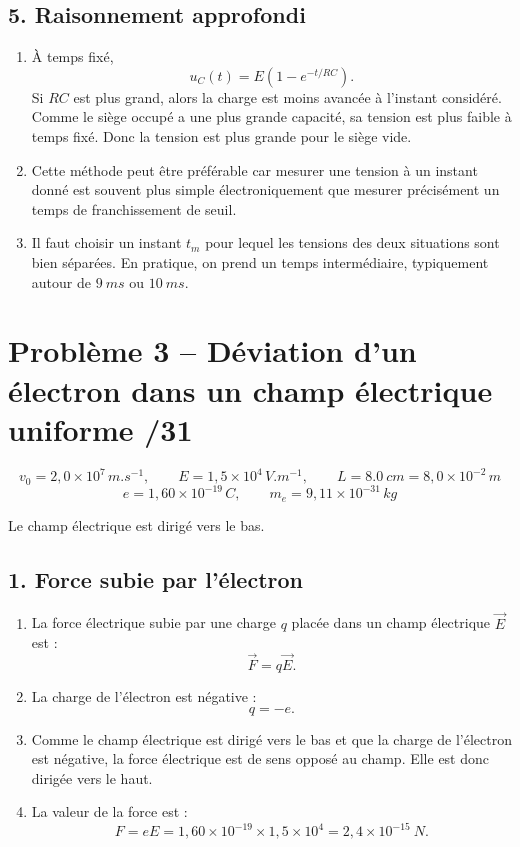 \documentclass[11pt,a4paper]{article}
\begin{document}
\subsection*{5. Raisonnement approfondi}

\begin{enumerate}
    \item À temps fixé,
    \[
    u_C(t)=E\left(1-e^{-t/RC}\right).
    \]
    Si \(RC\) est plus grand, alors la charge est moins avancée à l'instant considéré. Comme le siège occupé a une plus grande capacité, sa tension est plus faible à temps fixé. Donc la tension est plus grande pour le siège vide.

    \item Cette méthode peut être préférable car mesurer une tension à un instant donné est souvent plus simple électroniquement que mesurer précisément un temps de franchissement de seuil.

    \item Il faut choisir un instant \(t_m\) pour lequel les tensions des deux situations sont bien séparées. En pratique, on prend un temps intermédiaire, typiquement autour de \(\SI{9}{ms}\) ou \(\SI{10}{ms}\).
\end{enumerate}

\newpage

\section*{Problème 3 -- Déviation d'un électron dans un champ électrique uniforme \hfill /31}

\[
v_0=2{,}0\times10^7\,\si{m.s^{-1}},\qquad
E=1{,}5\times10^4\,\si{V.m^{-1}},\qquad
L=\SI{8.0}{cm}=8{,}0\times10^{-2}\,\si{m}
\]
\[
e=1{,}60\times10^{-19}\,\si{C},\qquad
m_e=9{,}11\times10^{-31}\,\si{kg}
\]

Le champ électrique est dirigé vers le bas.

\subsection*{1. Force subie par l'électron}

\begin{enumerate}
    \item La force électrique subie par une charge \(q\) placée dans un champ électrique \(\vec E\) est :
    \[
    \vec F=q\vec E.
    \]

    \item La charge de l'électron est négative :
    \[
    q=-e.
    \]

    \item Comme le champ électrique est dirigé vers le bas et que la charge de l'électron est négative, la force électrique est de sens opposé au champ. Elle est donc dirigée vers le haut.

    \item La valeur de la force est :
    \[
    F=eE=1{,}60\times10^{-19}\times1{,}5\times10^4
    =2{,}4\times10^{-15}\ \si{N}.
    \]
\end{enumerate}
\end{document}
